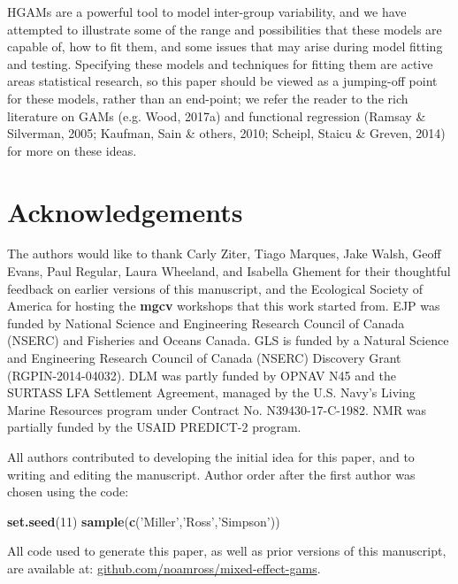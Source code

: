 \documentclass[12pt]{article}
\newenvironment{Shaded}{\begin{snugshade}}{\end{snugshade}}
\newcommand{\KeywordTok}[1]{\textcolor[rgb]{0.13,0.29,0.53}{\textbf{#1}}}
\newcommand{\DecValTok}[1]{\textcolor[rgb]{0.00,0.00,0.81}{#1}}
\newcommand{\StringTok}[1]{\textcolor[rgb]{0.31,0.60,0.02}{#1}}
\newcommand{\NormalTok}[1]{#1}
\begin{document}
HGAMs are a powerful tool to model inter-group variability, and we have
attempted to illustrate some of the range and possibilities that these
models are capable of, how to fit them, and some issues that may arise
during model fitting and testing. Specifying these models and techniques
for fitting them are active areas statistical research, so this paper
should be viewed as a jumping-off point for these models, rather than an
end-point; we refer the reader to the rich literature on GAMs (e.g.
Wood, 2017a) and functional regression (Ramsay \& Silverman, 2005;
Kaufman, Sain \& others, 2010; Scheipl, Staicu \& Greven, 2014) for more
on these ideas.

\section{Acknowledgements}\label{acknowledgements}

The authors would like to thank Carly Ziter, Tiago Marques, Jake Walsh,
Geoff Evans, Paul Regular, Laura Wheeland, and Isabella Ghement for
their thoughtful feedback on earlier versions of this manuscript, and
the Ecological Society of America for hosting the \textbf{mgcv}
workshops that this work started from. EJP was funded by National
Science and Engineering Research Council of Canada (NSERC) and Fisheries
and Oceans Canada. GLS is funded by a Natural Science and Engineering
Research Council of Canada (NSERC) Discovery Grant (RGPIN-2014-04032).
DLM was partly funded by OPNAV N45 and the SURTASS LFA Settlement
Agreement, managed by the U.S. Navy's Living Marine Resources program
under Contract No. N39430-17-C-1982. NMR was partially funded by the
USAID PREDICT-2 program.

All authors contributed to developing the initial idea for this paper,
and to writing and editing the manuscript. Author order after the first
author was chosen using the code:

\begin{Shaded}
\begin{Highlighting}[]
\KeywordTok{set.seed}\NormalTok{(}\DecValTok{11}\NormalTok{)}
\KeywordTok{sample}\NormalTok{(}\KeywordTok{c}\NormalTok{(}\StringTok{'Miller'}\NormalTok{,}\StringTok{'Ross'}\NormalTok{,}\StringTok{'Simpson'}\NormalTok{))}
\end{Highlighting}
\end{Shaded}

All code used to generate this paper, as well as prior versions of this
manuscript, are available at:
\href{https://github.com/noamross/mixed-effect-gams}{github.com/noamross/mixed-effect-gams}.
\end{document}
